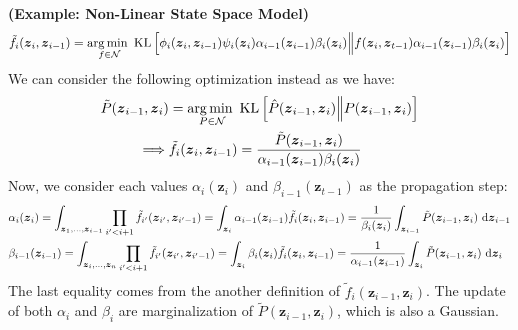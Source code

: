 \begin{remark}{\textbf{(Example: Non-Linear State Space Model)}}
\begin{equation*}
        \tilde{f}_i(\boldsymbol z_i, \boldsymbol z_{i-1}) = \underset{f\in\mathcal{N}}{\arg\min \ } \operatorname{KL}\left[  \phi_i(\boldsymbol z_i, \boldsymbol z_{i-1})\psi_i(\boldsymbol z_i)\alpha_{i-1}(\boldsymbol z_{i-1})\beta_i(\boldsymbol z_i) \Big\| f(\boldsymbol z_i, \boldsymbol z_{t-1}) \alpha_{i-1}(\boldsymbol z_{i-1})\beta_i(\boldsymbol z_i)  \right]
    \end{equation*}
    We can consider the following optimization instead as we have:
    \begin{equation*}
    \begin{aligned}
        \tilde{P}(\boldsymbol z_{i-1}, \boldsymbol z_i) &= \underset{P\in\mathcal{N}}{\arg\min \ }\operatorname{KL}\left[  \hat{P}(\boldsymbol z_{i-1}, \boldsymbol z_i) \Big\| P(\boldsymbol z_{i-1}, \boldsymbol z_i)  \right] \\
        \implies&  \tilde{f}_i(\boldsymbol z_i, \boldsymbol z_{i-1}) = \frac{\tilde{P}(\boldsymbol z_{i-1}, \boldsymbol z_i)}{\alpha_{i-1}(\boldsymbol z_{i-1})\beta_i(\boldsymbol z_i) }
    \end{aligned}
    \end{equation*}
    Now, we consider each values $\alpha_i(\boldsymbol z_i)$ and $\beta_{i-1}(\boldsymbol z_{t-1})$ as the propagation step:
    \begin{equation*}
    \begin{aligned}
        &\alpha_i(\boldsymbol z_i) = \int_{\boldsymbol z_1,\dots,\boldsymbol z_{i-1}} \prod_{i' < i+1}\tilde{f}_{i'}(\boldsymbol z_{i'}, \boldsymbol z_{i'-1}) = \int_{\boldsymbol z_i}\alpha_{i-1}(\boldsymbol z_{i-1})\tilde{f}_i(\boldsymbol z_i, \boldsymbol z_{i-1}) = \frac{1}{\beta_i(\boldsymbol z_i)} \int_{\boldsymbol z_{i-1}} \tilde{P}(\boldsymbol z_{i-1}, \boldsymbol z_i)\ \mathrm{d} \boldsymbol z_{i-1} \\
        &\beta_{i-1}(\boldsymbol z_{i-1}) = \int_{\boldsymbol z_{i},\dots,\boldsymbol z_{n}}\prod_{i' < i+1}\tilde{f}_{i'}(\boldsymbol z_{i'}, \boldsymbol z_{i'-1}) = \int_{\boldsymbol z_i}\beta_i(\boldsymbol z_i)\tilde{f}_i(\boldsymbol z_i, \boldsymbol z_{i-1}) = \frac{1}{\alpha_{i-1}(\boldsymbol z_{i-1})} \int_{\boldsymbol z_i} \tilde{P}(\boldsymbol z_{i-1}, \boldsymbol z_i)\ \mathrm{d} \boldsymbol z_i
    \end{aligned}
    \end{equation*}
    The last equality comes from the another definition of $\tilde{f}_i(\boldsymbol z_{i-1}, \boldsymbol z_i)$. The update of both $\alpha_i$ and $\beta_i$ are marginalization of $\tilde{P}(\boldsymbol z_{i-1}, \boldsymbol z_i)$, which is also a Gaussian.
\end{remark}


